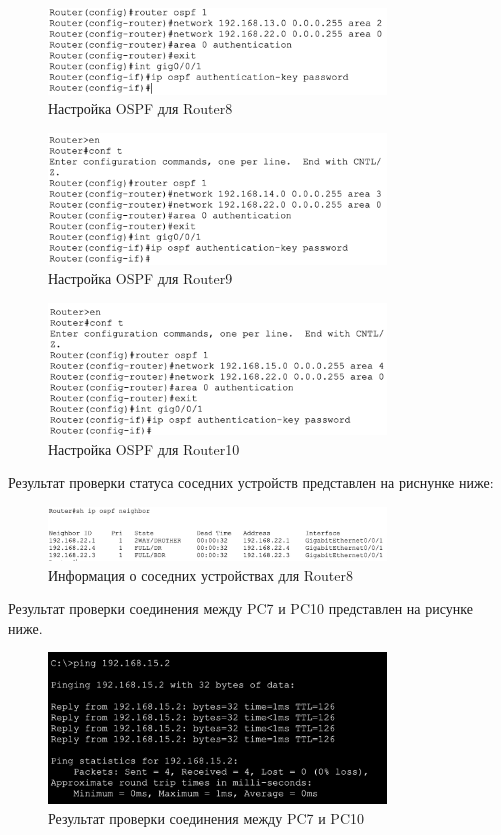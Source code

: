 \begin{figure}[H]
    \centering
    \includegraphics[width=0.8\textwidth]{images/pozor_2.png}
    \caption{Настройка OSPF для Router8}
    \label{fig:router8}
\end{figure}

\begin{figure}[H]
    \centering
    \includegraphics[width=0.8\textwidth]{images/pozor_3.png}
    \caption{Настройка OSPF для Router9}
    \label{fig:router9}
\end{figure}

\begin{figure}[H]
    \centering
    \includegraphics[width=0.8\textwidth]{images/pozor_4.png}
    \caption{Настройка OSPF для Router10}
    \label{fig:router10}
\end{figure}

Результат проверки статуса соседних устройств представлен на риснунке ниже:

\begin{figure}[H]
    \centering
    \includegraphics[width=0.8\textwidth]{images/prefinal.png}
    \caption{Информация о соседних устройствах для Router8}
    \label{fig:neighbor}
\end{figure}

Результат проверки соединения между PC7 и PC10 представлен на рисунке ниже.

\begin{figure}[H]
    \centering
    \includegraphics[width=0.8\textwidth]{images/final.png}
    \caption{Результат проверки соединения между PC7 и PC10}
    \label{fig:ping_2}
\end{figure}
